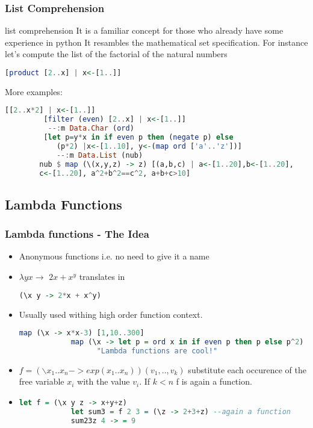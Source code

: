 	
	\begin{frame}[fragile]\frametitle{List Comprehension}
		\begin{exampleblock}{list comprehension}
		It is a familiar concept for those who already have some experience in python
		It resambles the mathematical set specification. For instance let's compute
		the list of the factorial of the natural numbers 
		 \begin{lstlisting}[language=Haskell,basicstyle=\footnotesize\ttfamily] 
		 [product [2..x] | x<-[1..]] 		
		\end{lstlisting} 
		\end{exampleblock}
		More examples:
		\begin{lstlisting}[language=Haskell,basicstyle=\footnotesize\ttfamily] 
		 [[2..x*2] | x<-[1..]]
		 [filter (even) [2..x] | x<-[1..]]
		  --:m Data.Char (ord)
		 [let p=y*x in if even p then (negate p) else 
		 	(p*2) |x<-[1..10], y<-(map ord ['a'..'z'])]
		 	--:m Data.List (nub) 
		nub $ map (\(x,y,z) -> z) [(a,b,c) | a<-[1..20],b<-[1..20],
		c<-[1..20], a^2+b^2==c^2, a+b+c>10]
		\end{lstlisting}
			
		
	\end{frame}
	
	
	\subsection{Lambda Functions}
	\begin{frame}[fragile]\frametitle{Lambda functions - The Idea}
		\begin{itemize}
		  \item Anonymous functions i.e. no need to give it a name
		  \item $\lambda y x \rightarrow$ $2x+x^y$ translates in
		   \begin{lstlisting}[language=Haskell] 
			(\x y -> 2*x + x^y)
		\end{lstlisting}
		\item Usually used withing high order function context.
		\begin{lstlisting}[language=Haskell,basicstyle=\footnotesize\ttfamily] 
			map (\x -> x*x-3) [1,10..300]
			map (\x -> let p = ord x in if even p then p else p^2) 
			      "Lambda functions are cool!"
		\end{lstlisting}
		\end{itemize}
		
		
		\begin{itemize}
		  \item $f= (\backslash x_1 .. x_n  -> exp(x_1..x_n)) (v_1, ..,v_k) $
		   substitute each occurence of the free variable $x_i$ with the
		  value $v_i$. If $k<n$ f is again a function.
		  \item 
		\begin{lstlisting}[language=Haskell,basicstyle=\footnotesize\ttfamily] 
			let f = (\x y z -> x+y+z)
			let sum3 = f 2 3 = (\z -> 2+3+z) --again a function
			sum23z 4 -> = 9 
		\end{lstlisting}		  
		\end{itemize}
			
		
	\end{frame}
	
	
	